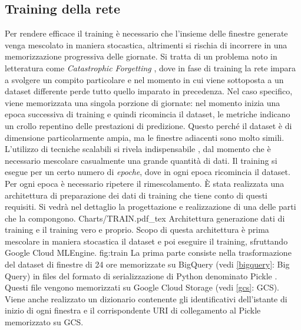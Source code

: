 \subsection{Training della rete}
Per rendere efficace il training è necessario che l’insieme delle finestre generate venga mescolato in maniera stocastica, altrimenti si rischia di incorrere in una memorizzazione progressiva delle giornate. Si tratta di un problema noto in letteratura come \textit{Catastrophic Forgetting} \cite{kemker2018measuring}, dove in fase di training la rete impara a svolgere un compito particolare e nel momento in cui viene sottoposta a un dataset differente perde tutto quello imparato in precedenza. Nel caso specifico, viene memorizzata una singola porzione di giornate: nel momento inizia una epoca successiva di training e quindi ricomincia il dataset, le metriche indicano un crollo repentino delle prestazioni di predizione. Questo perché il dataset è di dimensione particolarmente ampia, ma le finestre adiacenti sono molto simili. L’utilizzo di tecniche scalabili si rivela indispensabile \cite{chung2017ubershuffle}, dal momento che è necessario mescolare casualmente una grande quantità di dati. Il training si esegue per un certo numero di \textit{epoche}, dove in ogni epoca ricomincia il dataset. Per ogni epoca è necessario ripetere il rimescolamento.
È stata realizzata una architettura di preparazione dei dati di training che tiene conto di questi requisiti. Si vedrà nel dettaglio la progettazione e realizzazione di una delle parti che la compongono.
\svg
{Charts/TRAIN.pdf_tex}
{Architettura generazione dati di training e il training vero e proprio. Scopo di questa architettura è prima mescolare in maniera stocastica il dataset e poi eseguire il training, sfruttando Google Cloud MLEngine. }
{fig:train}
La prima parte consiste nella trasformazione del dataset di finestre di 24 ore memorizzate su BigQuery (vedi \ref{bigquery}: Big Query) in files del formato di serializzazione di Python denominato Pickle \cite{pickle}. Questi file vengono memorizzati su Google Cloud Storage (vedi \ref{gcs}: GCS). Viene anche realizzato un dizionario contenente gli identificativi dell’istante di inizio di ogni finestra e il corrispondente URI di collegamento al Pickle memorizzato su GCS.